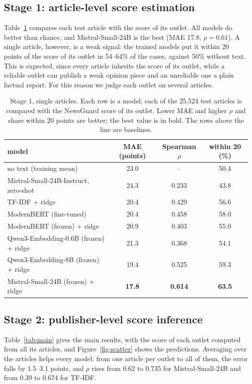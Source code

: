 \documentclass[11pt,a4paper]{article}
\begin{document}
\subsection{Stage 1: article-level score estimation}\label{sec:stage1}
Table~\ref{tab:article} compares each test article with the score of its outlet. All models do better than chance, and
Mistral-Small-24B is the best (MAE 17.8, $\rho = 0.61$). A single article, however, is a weak signal: the trained models
put it within 20 points of the score of its outlet in 54--64\% of the cases, against 50\% without text. This is
expected, since every article inherits the score of its outlet, while a reliable outlet can publish a weak opinion piece
and an unreliable one a plain factual report. For this reason we judge each outlet on several articles.

\begin{table}[t]
\centering
\caption{Stage 1, single articles. Each row is a model; each of the 25,524 test articles is compared with the NewsGuard
score of its outlet. Lower MAE and higher $\rho$ and share within 20 points are better; the best value is in bold. The
rows above the line are baselines.}\label{tab:article}
\begin{tabular}{lccc}
\toprule
model & MAE (points) & Spearman $\rho$ & within 20 (\%) \\
\midrule
no text (training mean) & 23.0 & -- & 50.4 \\
Mistral-Small-24B-Instruct, zero-shot & 24.3 & 0.233 & 43.8 \\
\midrule
TF-IDF + ridge & 20.4 & 0.429 & 56.6 \\
ModernBERT (fine-tuned) & 20.4 & 0.458 & 58.0 \\
ModernBERT (frozen) + ridge & 20.9 & 0.403 & 55.0 \\
Qwen3-Embedding-0.6B (frozen) + ridge & 21.3 & 0.368 & 54.1 \\
Qwen3-Embedding-8B (frozen) + ridge & 19.4 & 0.525 & 59.3 \\
Mistral-Small-24B (frozen) + ridge & \textbf{17.8} & \textbf{0.614} & \textbf{63.5} \\
\bottomrule
\end{tabular}
\end{table}

\subsection{Stage 2: publisher-level score inference}\label{sec:stage2}
Table~\ref{tab:main} gives the main results, with the score of each outlet computed from all its articles, and
Figure~\ref{fig:scatter} shows the predictions. Averaging over the articles helps every model: from one article per
outlet to all of them, the error falls by 1.5--3.1 points, and $\rho$ rises from 0.62 to 0.735 for Mistral-Small-24B
and from 0.39 to 0.674 for TF-IDF.
\end{document}
